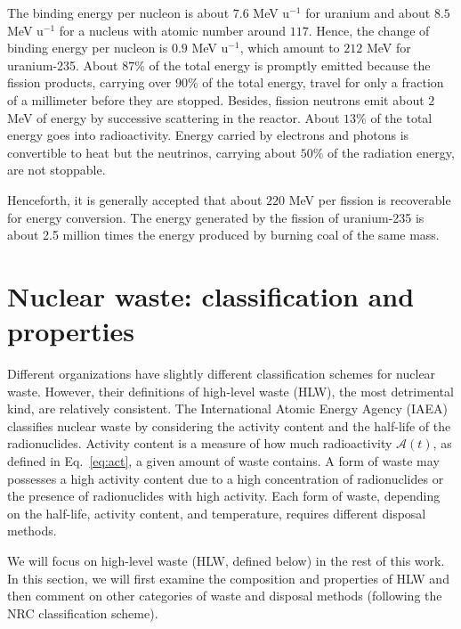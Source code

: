 \documentclass[nofootinbib,preprint,aps]{revtex4-1}
\begin{document}
        The binding energy per nucleon is about $7.6$ MeV u${}^{-1}$ for uranium and about $8.5$ MeV u${}^{-1}$
        for a nucleus with atomic number around $117$. Hence, the change of binding energy per nucleon is
        $0.9$ MeV u${}^{-1}$, which amount to $212$ MeV for uranium-235.
        About $87\%$ of the total energy is promptly emitted because
        the fission products, carrying over $90\%$ of the total energy, travel for only a fraction of a
        millimeter before they are stopped. Besides, fission neutrons emit about $2$ MeV of energy by
        successive scattering in the reactor.
        About $13\%$ of the total energy goes into radioactivity. Energy carried by electrons and photons is
        convertible to heat but the neutrinos, carrying about $50\%$ of the radiation energy, are not stoppable.

        Henceforth, it is generally accepted that about $220$ MeV per fission is recoverable for energy conversion.
        The energy generated by the fission of uranium-235 is 
        about 2.5 million times the energy produced by burning coal of the same mass.\cite{e17}

\section{Nuclear waste: classification and properties}
\label{sec:waste}
    Different organizations have slightly different classification schemes for nuclear waste.
    However, their definitions of high-level waste (HLW), the most detrimental kind, are relatively consistent.
    The International Atomic Energy Agency (IAEA) classifies nuclear waste by considering the activity
    content and the half-life of the radionuclides.
    Activity content is a measure of how much radioactivity $\mathcal{A}(t)$, as defined in Eq.~\ref{eq:act},
    a given amount of waste contains.
    A form of waste may possesses a high activity content due to
    a high concentration of radionuclides or the presence of radionuclides with high activity.\cite{iaea09}
    Each form of waste, depending on the half-life, activity content, and temperature, requires different
    disposal methods.

    We will focus on high-level waste (HLW, defined below) in the rest of this work.
    In this section, we will first examine the composition and properties of HLW and then
    comment on other categories of waste and disposal methods (following the NRC classification scheme). 
\end{document}
